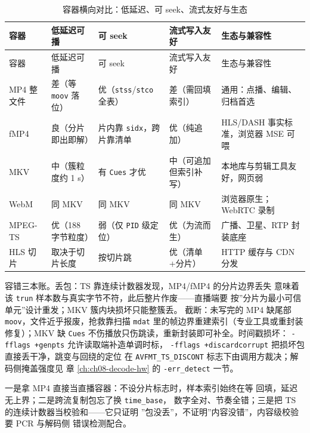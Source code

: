 \documentclass[12pt,a4paper,fontset=fandol]{ctexbook}
\newcommand{\Tp}[1]{\texttt{#1}}
\newcommand{\Bk}{\discretionary{}{}{}}
\begin{document}
\small
\begin{longtable}{>{\raggedright\arraybackslash}p{}
                  >{\raggedright\arraybackslash}p{}
                  >{\raggedright\arraybackslash}p{}
                  >{\raggedright\arraybackslash}p{}
                  >{\raggedright\arraybackslash}p{}}
\caption{容器横向对比：低延迟、可 seek、流式友好与生态}\label{tab:ch10-containers} \\
\toprule
容器 & 低延迟可播 & 可 seek & 流式写入友好 & 生态与兼容性 \\
\midrule
\endfirsthead
\toprule
容器 & 低延迟可播 & 可 seek & 流式写入友好 & 生态与兼容性 \\
\midrule
\endhead
\midrule
\endfoot
\bottomrule
\endlastfoot
MP4 整文件 & 差（等 \Tp{moov} 落位） & 优（\Tp{stss}/{\Bk}\Tp{stco} 全表） &
  差（需回填索引） & 通用：点播、编辑、归档首选 \\
fMP4 & 良（分片即出即解） & 片内靠 \Tp{sidx}，跨片靠清单 &
  优（纯追加） & HLS/DASH 事实标准，浏览器 MSE 可喂 \\
MKV & 中（簇粒度约 1 s） & 有 \Tp{Cues} 才优 &
  中（可追加但索引补写） & 本地库与剪辑工具友好，网页弱 \\
WebM & 同 MKV & 同 MKV & 同 MKV & 浏览器原生；WebRTC 录制 \\
MPEG\Bk-TS & 优（188 字节粒度） & 弱（仅 \Tp{PID} 级定位） &
  优（为流而生） & 广播、卫星、RTP 封装底座 \\
HLS 切片 & 取决于切片长度 & 按切片跳 & 优（清单+分片） &
  HTTP 缓存与 CDN 分发 \\
\end{longtable}
\normalsize

容错三本账。丢包：TS 靠连续计数器发现，MP4/fMP4 的分片边界丢失
意味着该 \Tp{trun} 样本数与真实字节不符，此后整片作废——直播端要
按''分片为最小可信单元''设计重发；MKV 簇内块损坏只能整簇丢。
截断：未写完的 MP4 缺尾部 \Tp{moov}，文件近乎报废，抢救靠扫描
\Tp{mdat} 里的帧边界重建索引（专业工具或重封装修复）；MKV 缺
\Tp{Cues} 不伤播放只伤跳读，重新封装即可补全。时间戳损坏：
\Tp{-fflags +genpts} 允许读取端补造单调时标，
\Tp{-fflags +discardcorrupt} 把损坏包直接丢干净，跳变与回绕的定位
在 \Tp{AVFMT\_TS\_DISCONT} 标志下由调用方裁决；解码侧掩盖强度见
章 \ref{ch:ch08-decode-hw} 的 \Tp{-err\_detect} 一节。

\begin{warning}[title={三个常见翻车点}]
  一是拿 MP4 直接当直播容器：不设分片标志时，样本索引始终在等
  回填，延迟无上界；二是跨流复制包忘了换 \Tp{time\_base}，
  数字全对、节奏全错；三是把 TS 的连续计数器当校验和——它只证明
  ''包没丢''，不证明''内容没错''，内容级校验要 PCR 与解码侧
  错误检测配合。
\end{warning}
\end{document}
